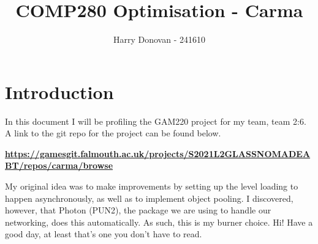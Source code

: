 \documentclass{article}
\title{COMP280 Optimisation - Carma}
\author{Harry Donovan - 241610}
\begin{document}
\maketitle

\tableofcontents

\newpage

\section{Introduction}

In this document I will be profiling the GAM220 project for my team, team 2:6. A link to the git repo for the project can be found below.

\textbf{\url{https://gamesgit.falmouth.ac.uk/projects/S2021L2GLASSNOMADEABT/repos/carma/browse}}

My original idea was to make improvements by setting up the level loading to happen asynchronously, as well as to implement object pooling. I discovered, however, that Photon (PUN2), the package we are using to handle our networking, does this automatically. As such, this is my burner choice. Hi! Have a good day, at least that's one you don't have to read.



\end{document}
